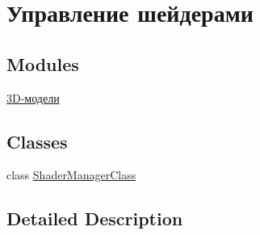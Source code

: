 \hypertarget{group___shader_managment}{}\section{Управление шейдерами}
\label{group___shader_managment}
\subsection*{Modules}
\begin{DoxyCompactItemize}
\item 
\hyperlink{group___shaders}{3\+D-\/модели}
\end{DoxyCompactItemize}
\subsection*{Classes}
\begin{DoxyCompactItemize}
\item 
class \hyperlink{class_shader_manager_class}{Shader\+Manager\+Class}
\end{DoxyCompactItemize}


\subsection{Detailed Description}
